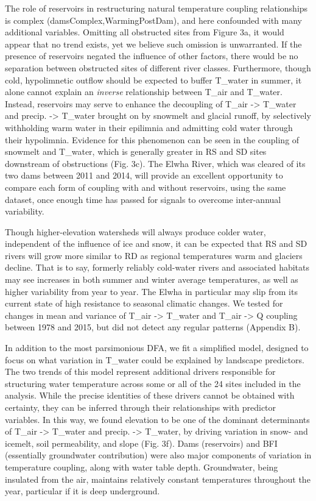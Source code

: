 The role of reservoirs in restructuring natural temperature coupling relationships is complex (damsComplex,WarmingPostDam), and here confounded with many additional variables. Omitting all obstructed sites from Figure 3a, it would appear that no trend exists, yet we believe such omission is unwarranted. If the presence of reservoirs negated the influence of other factors, there would be no separation between obstructed sites of different river classes. Furthermore, though cold, hypolimnetic outflow should be expected to buffer T_water in summer, it alone cannot explain an {\it inverse} relationship between T_air and T_water. Instead, reservoirs may serve to enhance the decoupling of T_{air} -> T_{water} and precip. -> T_{water} brought on by snowmelt and glacial runoff, by selectively withholding warm water in their epilimnia and admitting cold water through their hypolimnia. Evidence for this phenomenon can be seen in the coupling of snowmelt and T_water, which is generally greater in RS and SD sites downstream of obstructions (Fig. 3c). The Elwha River, which was cleared of its two dams between 2011 and 2014, will provide an excellent opportunity to compare each form of coupling with and without reservoirs, using the same dataset, once enough time has passed for signals to overcome inter-annual variability.

Though higher-elevation watersheds will always produce colder water, independent of the influence of ice and snow, it can be expected that RS and SD rivers will grow more similar to RD as regional temperatures warm and glaciers decline. That is to say, formerly reliably cold-water rivers and associated habitats may see increases in both summer and winter average temperatures, as well as higher variability from year to year. The Elwha in particular may slip from its current state of high resistance to seasonal climatic changes. We tested for changes in mean and variance of T_air -> T_water and T_air -> Q coupling between 1978 and 2015, but did not detect any regular patterns (Appendix B).

In addition to the most parsimonious DFA, we fit a simplified model, designed to focus on what variation in T_water could be explained by landscape predictors. The two trends of this model represent additional drivers responsible for structuring water temperature across some or all of the 24 sites included in the analysis. While the precise identities of these drivers cannot be obtained with certainty, they can be inferred through their relationships with predictor variables. In this way, we found elevation to be one of the dominant determinants of T_air -> T_water and precip. -> T_water, by driving variation in snow- and icemelt, soil permeability, and slope (Fig. 3f). Dams (reservoirs) and BFI (essentially groundwater contribution) were also major components of variation in temperature coupling, along with water table depth. Groundwater, being insulated from the air, maintains relatively constant temperatures throughout the year, particular if it is deep underground.

